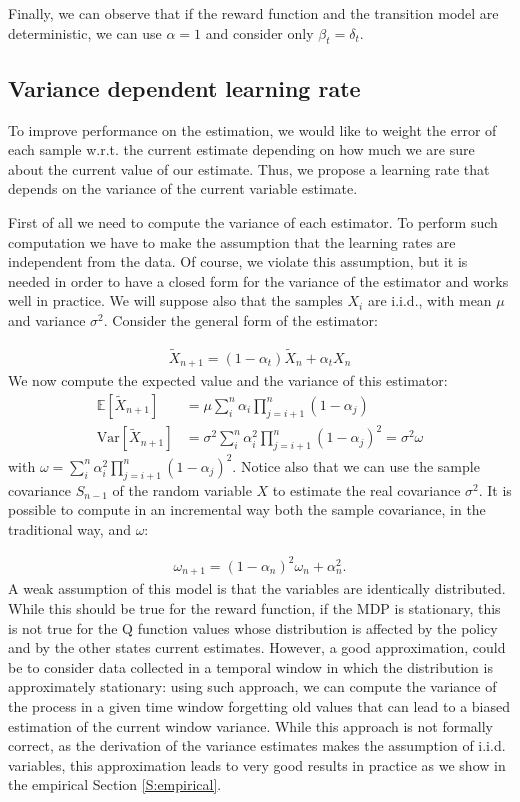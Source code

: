 \documentclass[conference]{IEEEtran}
\begin{document}
Finally, we can observe that if the reward function and the transition model are deterministic, we can use $\alpha=1$ and consider only $\beta_t=\delta_t$.

\subsection{Variance dependent learning rate}
To improve performance on the estimation, we would like to weight the error of each sample w.r.t. the current estimate depending on how much we are sure about the current value of our estimate. Thus, we propose a learning rate that depends on the variance of the current variable estimate.

First of all we need to compute the variance of each estimator. To perform such computation we have to make the assumption that the learning rates are independent from the data. Of course, we violate this assumption, but it is needed in order to have a closed form for the variance of the estimator and works well in practice. We will suppose also that the samples $X_i$ are i.i.d., with mean $\mu$ and variance $\sigma^2$. Consider the general form of the estimator:

\begin{align}
 \widetilde{X}_{n+1} = (1-\alpha_t)\widetilde{X}_{n}+\alpha_tX_{n}
\end{align}
We now compute the expected value and the variance of this estimator:
\begin{align}
 \mathbb{E}\left[\widetilde{X}_{n+1}\right]& = \mu\sum_i^n \alpha_i \prod_{j=i+1}^{n} \left(1-\alpha_j\right)\\
 \mathrm{Var}\left[\widetilde{X}_{n+1}\right]& = \sigma^2\sum_i^n \alpha_i^2 \prod_{j=i+1}^{n} \left(1-\alpha_j\right)^2 = \sigma^2\omega
\end{align}
with $\omega=\sum_i^n \alpha_i^2 \prod_{j=i+1}^{n} \left(1-\alpha_j\right)^2$. Notice also that we can use the sample covariance $S_{n-1}$ of the random variable $X$ to estimate the real covariance $\sigma^2$. It is possible to compute in an incremental way both the sample covariance, in the traditional way, and $\omega$:

\begin{align}
 \omega_{n+1}=(1-\alpha_n)^2\omega_n+\alpha_n^2.
\end{align}
A weak assumption of this model is that the variables are identically distributed. While this should be true for the reward function, if the MDP is stationary, this is not true for the Q function values whose distribution is affected by the policy and by the other states current estimates. However, a good approximation, could be to consider data collected in a temporal window in which the distribution is approximately stationary: using such approach, we can compute the variance of the process in a given time window forgetting old values that can lead to a biased estimation of the current window variance. While this approach is not formally correct, as the derivation of the variance estimates makes the assumption of i.i.d. variables, this approximation leads to very good results in practice as we show in the empirical Section \ref{S:empirical}.
\end{document}

